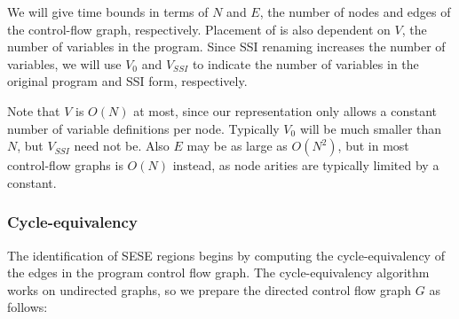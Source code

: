 \documentclass[12pt,titlepage,twoside]{article}
\begin{document}
We will give time bounds in terms of $N$ and $E$, the number of nodes
and edges of the control-flow graph, respectively.
Placement of 
is also dependent on $V$, the number of variables in the program.
Since SSI renaming increases the number of variables, we will use
$V_0$ and $V_{SSI}$ to indicate the number of variables in the
original program and SSI form, respectively.

Note that $V$ is $O(N)$ at most, since our representation only allows
a constant number of variable definitions per node.  Typically $V_0$
will be much smaller than $N$, but $V_{SSI}$ need not be.  Also $E$
may be as large as $O(N^2)$, but in most control-flow graphs is $O(N)$
instead, as node arities are typically limited by a constant.

\subsubsection{Cycle-equivalency}
\newcommand{\cyceq}{\equiv_{cq}}%
The identification of SESE regions begins by computing the
cycle-equivalency of the edges in the program control flow graph.  The
cycle-equivalency algorithm works on undirected graphs, so we prepare the
directed control flow graph $G$ as follows:
\end{document}
